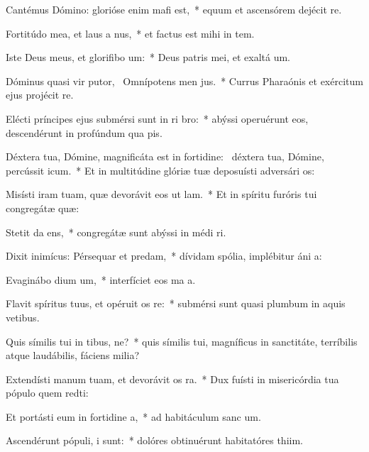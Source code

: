 \item Cantémus Dómino: glorióse enim mafi est,~* equum et ascensórem dejécit  re.
\item Fortitúdo mea, et laus a nus,~* et factus est mihi in tem.
\item Iste Deus meus, et glorifibo um:~* Deus patris mei, et exaltá um.
\item Dóminus quasi vir putor,~\pscross{} Omnípotens men jus.~* Currus Pharaónis et exércitum ejus projécit  re.
\item Elécti príncipes ejus submérsi sunt in ri bro:~* abýssi operuérunt eos, descendérunt in profúndum qua pis.
\item Déxtera tua, Dómine, magnificáta est in fortidine:~\pscross{} déxtera tua, Dómine, percússit icum.~* Et in multitúdine glóriæ tuæ deposuísti adversári os:
\item Misísti iram tuam, quæ devorávit eos ut lam.~* Et in spíritu furóris tui congregátæ  quæ:
\item Stetit da ens,~* congregátæ sunt abýssi in médi ri.
\item Dixit inimícus: Pérsequar et predam,~* dívidam spólia, implébitur áni a:
\item Evaginábo dium um,~* interfíciet eos ma a.
\item Flavit spíritus tuus, et opéruit os re:~* submérsi sunt quasi plumbum in aquis vetibus.
\item Quis símilis tui in tibus, ne?~* quis símilis tui, magníficus in sanctitáte, terríbilis atque laudábilis, fáciens milia?
\item Extendísti manum tuam, et devorávit os ra.~* Dux fuísti in misericórdia tua pópulo quem redti:
\item Et portásti eum in fortidine a,~* ad habitáculum sanc um.
\item Ascendérunt pópuli,  i sunt:~* dolóres obtinuérunt habitatóres thiim.

